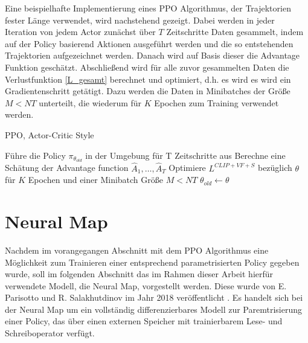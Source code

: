 Eine beispielhafte Implementierung eines \ac{PPO} Algorithmus, der Trajektorien fester Länge verwendet, wird nachstehend gezeigt. Dabei werden in jeder Iteration von jedem Actor zunächst über $T$ Zeitschritte Daten gesammelt, indem auf der Policy basierend Aktionen ausgeführt werden und die so entstehenden Trajektorien aufgezeichnet werden. Danach wird auf Basis dieser die Advantage Funktion geschätzt. Abschließend wird für alle zuvor gesammelten Daten die Verlustfunktion \eqref{L_gesamt} berechnet und optimiert, d.h. es wird es wird ein Gradientenschritt getätigt. Dazu werden die Daten in Minibatches der Größe $M<NT$ unterteilt, die wiederum für $K$ Epochen zum Training verwendet werden.

\begin{algorithm}
	\caption{\ac{PPO}, Actor-Critic Style}
	\begin{algorithmic}
        \State Führe die Policy $\pi_{\theta_{old}}$ in der Umgebung für T Zeitschritte aus
				\State Berechne eine Schätung der Advantage function $\hat{A}_1,\dots,\hat{A}_T$
			\EndFor
			\State Optimiere $L^{CLIP+VF+S}$ bezüglich $\theta$ für $K$ Epochen und einer Minibatch Größe $M<NT$
			\State $\theta_{old} \gets \theta$
		\EndFor
	\end{algorithmic}
\end{algorithm}


\section{Neural Map}
\label{sec_neural_map}

Nachdem im vorangegangen Abschnitt mit dem \ac{PPO} Algorithmus eine Möglichkeit zum Trainieren einer entsprechend parametrisierten Policy gegeben wurde, soll im folgenden Abschnitt das im Rahmen dieser Arbeit hierfür verwendete Modell, die Neural Map, vorgestellt werden. Diese wurde von E. Parisotto und R. Salakhutdinov im Jahr 2018 veröffentlicht \cite{NeuralMap}. Es handelt sich bei der Neural Map um ein vollständig differenzierbares Modell zur Paremtrisierung einer Policy, das über einen externen Speicher mit trainierbarem Lese- und Schreiboperator verfügt.

